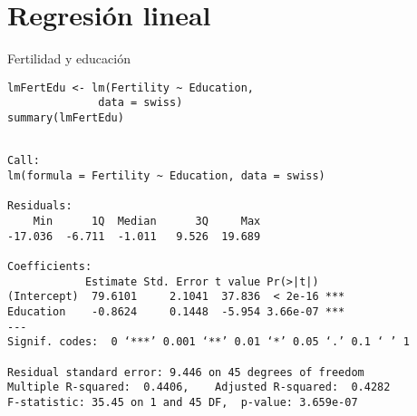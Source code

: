 \documentclass[xcolor={usenames,svgnames,dvipsnames}]{beamer}
\begin{document}
\section{Regresión lineal}
\label{sec:org26aa589}

\begin{frame}[fragile,label={sec:org83bf049}]{Fertilidad y educación}
 \lstset{language=r,label= ,caption= ,captionpos=b,numbers=none}
\begin{lstlisting}
lmFertEdu <- lm(Fertility ~ Education,
              data = swiss)
summary(lmFertEdu)
\end{lstlisting}

\begin{verbatim}

Call:
lm(formula = Fertility ~ Education, data = swiss)

Residuals:
    Min      1Q  Median      3Q     Max 
-17.036  -6.711  -1.011   9.526  19.689 

Coefficients:
            Estimate Std. Error t value Pr(>|t|)    
(Intercept)  79.6101     2.1041  37.836  < 2e-16 ***
Education    -0.8624     0.1448  -5.954 3.66e-07 ***
---
Signif. codes:  0 ‘***’ 0.001 ‘**’ 0.01 ‘*’ 0.05 ‘.’ 0.1 ‘ ’ 1

Residual standard error: 9.446 on 45 degrees of freedom
Multiple R-squared:  0.4406,	Adjusted R-squared:  0.4282 
F-statistic: 35.45 on 1 and 45 DF,  p-value: 3.659e-07
\end{verbatim}
\end{frame}
\end{document}
